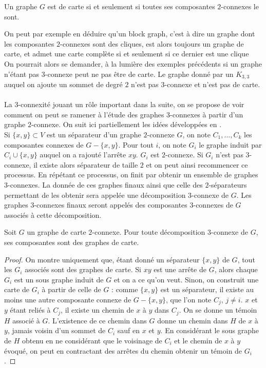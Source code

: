 \documentclass{scrartcl}
\begin{document}
\begin{flushleft}
\begin{prop}\label{suffbiconn}\cite{FptMap}
    Un graphe $G$ est de carte si et seulement si toutes ses composantes $2$-connexes le sont.
\end{prop}

On peut par exemple en déduire qu'un block graph, c'est à dire un graphe dont les composantes $2$-connexes sont des cliques,
est alors toujours un graphe de carte, et admet une carte complète si et seulement si ce dernier est une clique\\
On pourrait alors se demander, à la lumière des exemples précédents si un graphe n'étant pas $3$-connexe
peut ne pas être de carte. Le graphe donné par un $K_{3,3}$ auquel on ajoute un sommet de degré $2$ n'est pas $3$-connexe
et n'est pas de carte.
\\~\\
La $3$-connexité jouant un rôle important dans la suite, on se propose de voir comment on peut se ramener à l'étude des
graphes $3$-connexes à partir d'un graphe $2$-connexe. On suit ici partiellement les idées développées en \cite{3connComp}.\\
Si $\{x,y\} \subset V$ est un séparateur d'un graphe $2$-connexe $G$, on note $C_1, ..., C_k$ les composantes connexes de
$G - \{x,y\}$. Pour tout $i$, on note $G_i$ le graphe induit par $C_i \cup \{x,y\}$ auquel on a rajouté l'arrête $xy$.
$G_i$ est $2$-connexe. Si $G_i$ n'est pas $3$-connexe, il existe alors séparateur de taille $2$ et on peut ainsi recommencer
ce processus. En répétant ce processus, on finit par obtenir un ensemble de graphes $3$-connexes. La donnée de ces graphes finaux
ainsi que celle des $2$-séparateurs permettant de les obtenir sera appelée une décomposition $3$-connexe de $G$.
Les graphes $3$-connexes finaux seront appelés des composantes $3$-connexes de $G$ associés à cette décomposition.

\begin{prop}\label{3connCompCarte}
    Soit $G$ un graphe de carte $2$-connexe. Pour toute décomposition $3$-connexe de $G$, ses composantes sont des graphes de carte.
\end{prop}

\begin{proof}
    On montre uniquement que, étant donné un séparateur $\{x,y\}$ de $G$, tout les $G_i$ associés sont des graphes de carte.
    Si $xy$ est une arrête de $G$, alors chaque $G_i$ est un sous graphe induit de $G$ et on a ce qu'on veut. Sinon, on construit une
    carte de $G_i$ à partir de celle de $G$ : comme $\{x,y\}$ est un séparateur, il existe au moins une autre composante connexe de
    $G - \{x,y\}$, que l'on note $C_j$, $j \neq i$. $x$ et $y$ étant reliés à $C_j$, il existe un chemin de $x$ à $y$ dans $C_j$.
    On se donne un témoin $H$ associé à $G$. L'existence de ce chemin dans $G$ donne un chemin dans $H$ de $x$ à $y$, jamais voisin
    d'un sommet de $C_i$ sauf en $x$ et $y$. En considérant le sous graphe de $H$ obtenu en ne considérant que le voisinage de $C_i$ et le chemin
    de $x$ à $y$ évoqué, on peut en contractant des arrêtes du chemin obtenir un témoin de $G_i$.
\end{proof}


\end{flushleft}
\end{document}
